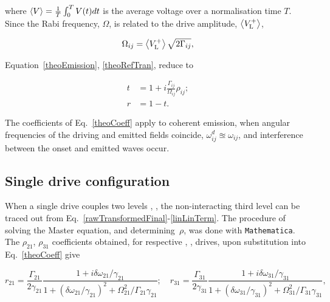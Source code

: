   \noindent where $\left\langle V\right\rangle = \frac{1}{T}\int_{0}^{T}V(t)dt$ is the average voltage over a normalisation time $ T $. Since the Rabi frequency, $ \Omega $, is related to the drive amplitude, $ \left\langle V_{\text{L}}^{+}\right\rangle  $, \cite{BreakdownoftheCrossKerrSchemeforPhotonCounting}
  
  \begin{equation}
   \Omega_{ij}=\left\langle V_{\text{L}}^{+}\right\rangle\sqrt{2\Gamma_{ij}},
  \end{equation}
  
  \noindent Equation~\eqref{theoEmission}, \eqref{theoRefTran}, reduce to
  
  \begin{equation}\label{theoCoeff}
  	\begin{aligned}
	  	t & = 1 + i\frac{\Gamma_{ij}}{\Omega_{ij}}\rho_{ij};\\
	  	r & = 1-t.
  	\end{aligned}
  \end{equation}
  
  \noindent The coefficients of Eq.~\eqref{theoCoeff} apply to coherent emission, when angular frequencies of the driving and emitted fields coincide, $ \omega^{d}_{ij} \approxeq\omega_{ij} $, and interference between the onset and emitted waves occur.  	
   
 \subsection{Single drive configuration\label{subsec:singleDrive}}
  When a single drive couples two levels , , the non-interacting third level can be traced out from Eq.~\eqref{rawTransformedFinal}-\eqref{linLinTerm}. The procedure of solving the Master equation, and determining~$ \rho $, was done with \texttt{Mathematica}. The $ \rho_{21} $, $ \rho_{31} $ coefficients obtained, for respective \lra{}, \lra{}, drives, upon substitution into Eq.~\eqref{theoCoeff} give
  
  \begin{equation}
  r_{21}=\frac{\Gamma_{21}}{2\gamma_{21}}\frac{1+i\delta\omega_{21}/\gamma_{21}}{1+(\delta\omega_{21}/\gamma_{21})^2+\Omega_{21}^2/\Gamma_{21}\gamma_{21}}; \quad r_{31}=\frac{\Gamma_{31}}{2\gamma_{31}}\frac{1+i\delta\omega_{31}/\gamma_{31}}{1+(\delta\omega_{31}/\gamma_{31})^2+\Omega_{31}^2/\Gamma_{31}\gamma_{31}},
  \label{singleReflectance}
  \end{equation}
  
